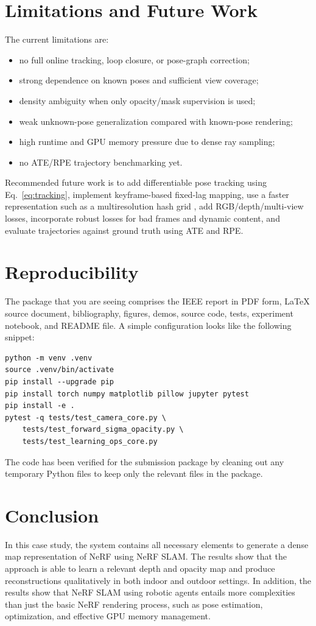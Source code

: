 \documentclass[conference]{IEEEtran}
\begin{document}
\section{Limitations and Future Work}
The current limitations are:
\begin{itemize}
    \item no full online tracking, loop closure, or pose-graph correction;
    \item strong dependence on known poses and sufficient view coverage;
    \item density ambiguity when only opacity/mask supervision is used;
    \item weak unknown-pose generalization compared with known-pose rendering;
    \item high runtime and GPU memory pressure due to dense ray sampling;
    \item no ATE/RPE trajectory benchmarking yet.
\end{itemize}

Recommended future work is to add differentiable pose tracking using Eq.~\eqref{eq:tracking}, implement keyframe-based fixed-lag mapping, use a faster representation such as a multiresolution hash grid \cite{muller2022instant}, add RGB/depth/multi-view losses, incorporate robust losses for bad frames and dynamic content, and evaluate trajectories against ground truth using ATE and RPE.

\section{Reproducibility}
The package that you are seeing comprises the IEEE report in PDF form, LaTeX source document, bibliography, figures, demos, source code, tests, experiment notebook, and README file. A simple configuration looks like the following snippet:
\begin{lstlisting}[style=compactpython]
python -m venv .venv
source .venv/bin/activate
pip install --upgrade pip
pip install torch numpy matplotlib pillow jupyter pytest
pip install -e .
pytest -q tests/test_camera_core.py \
    tests/test_forward_sigma_opacity.py \
    tests/test_learning_ops_core.py
\end{lstlisting}
The code has been verified for the submission package by cleaning out any temporary Python files to keep only the relevant files in the package.

\section{Conclusion}
In this case study, the system contains all necessary elements to generate a dense map representation of NeRF using NeRF SLAM. The results show that the approach is able to learn a relevant depth and opacity map and produce reconstructions qualitatively in both indoor and outdoor settings. In addition, the results show that NeRF SLAM using robotic agents entails more complexities than just the basic NeRF rendering process, such as pose estimation, optimization, and effective GPU memory management.
\end{document}
